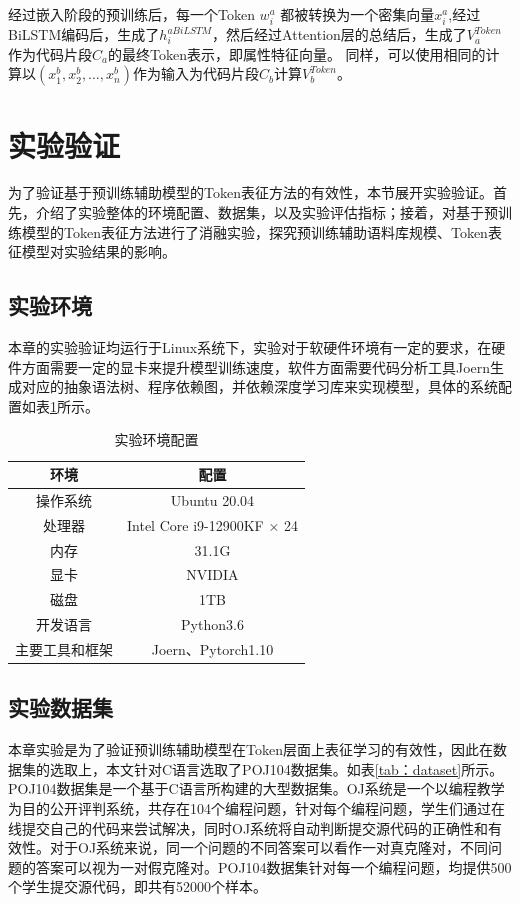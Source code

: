 经过嵌入阶段的预训练后，每一个Token $w_{i}^{a}$ 都被转换为一个密集向量$x_{i}^{a}$,经过BiLSTM编码后，生成了$h_{i}^{aBiLSTM}$，然后经过Attention层的总结后，生成了$V_{a}^{Token}$作为代码片段$C_{a}$的最终Token表示，即属性特征向量。
同样，可以使用相同的计算以$\left( x_{1}^{b},x_{2}^{b},\ldots,x_{n}^{b} \right)$作为输入为代码片段$C_{b}$计算$V_{b}^{Token}$。

\section{实验验证}
\label{sec:TokenExperiment}
为了验证基于预训练辅助模型的Token表征方法的有效性，本节展开实验验证。首先，介绍了实验整体的环境配置、数据集，以及实验评估指标；接着，对基于预训练模型的Token表征方法进行了消融实验，探究预训练辅助语料库规模、Token表征模型对实验结果的影响。

\subsection{实验环境}
\label{subsec:Environment}
本章的实验验证均运行于Linux系统下，实验对于软硬件环境有一定的要求，在硬件方面需要一定的显卡来提升模型训练速度，软件方面需要代码分析工具Joern生成对应的抽象语法树、程序依赖图，并依赖深度学习库来实现模型，具体的系统配置如表\ref{tab:environment}所示。
\begin{table}[htp]
  \centering
  \caption{实验环境配置} 
  \label{tab:environment}
  \renewcommand{\arraystretch}{1.1}
  \begin{tabular*}{0.5\textwidth}{@{\extracolsep{\fill}}cc}
  \toprule
    环境			&配置		\\
  \midrule
    操作系统		&Ubuntu 20.04 \\
    处理器			&Intel Core i9-12900KF × 24 \\
    内存			  &31.1G \\
    显卡			  &NVIDIA  \\
    磁盘			  &1TB \\
    开发语言    &Python3.6 \\
    主要工具和框架 &Joern、Pytorch1.10 \\
  \bottomrule
  \end{tabular*}
\end{table}

\subsection{实验数据集}
\label{subsec:Dataset}
本章实验是为了验证预训练辅助模型在Token层面上表征学习的有效性，因此在数据集的选取上，本文针对C语言选取了POJ104数据集。如表\ref{tab：dataset}所示。POJ104数据集是一个基于C语言所构建的大型数据集。OJ系统是一个以编程教学为目的公开评判系统，共存在104个编程问题，针对每个编程问题，学生们通过在线提交自己的代码来尝试解决，同时OJ系统将自动判断提交源代码的正确性和有效性。对于OJ系统来说，同一个问题的不同答案可以看作一对真克隆对，不同问题的答案可以视为一对假克隆对。POJ104数据集针对每一个编程问题，均提供500个学生提交源代码，即共有52000个样本。

